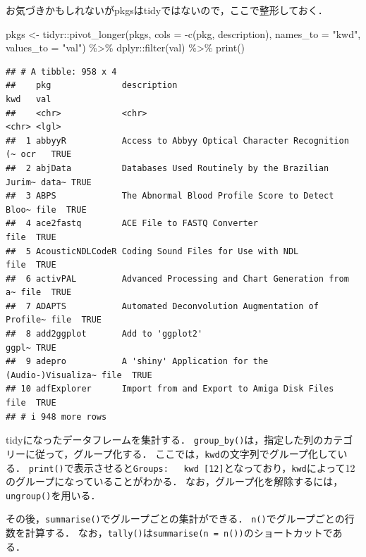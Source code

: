\documentclass[
]{article}
\newenvironment{Shaded}{\begin{snugshade}}{\end{snugshade}}
\newcommand{\AttributeTok}[1]{\textcolor[rgb]{0.77,0.63,0.00}{#1}}
\newcommand{\FunctionTok}[1]{\textcolor[rgb]{0.00,0.00,0.00}{#1}}
\newcommand{\NormalTok}[1]{#1}
\newcommand{\OtherTok}[1]{\textcolor[rgb]{0.56,0.35,0.01}{#1}}
\newcommand{\SpecialCharTok}[1]{\textcolor[rgb]{0.00,0.00,0.00}{#1}}
\newcommand{\StringTok}[1]{\textcolor[rgb]{0.31,0.60,0.02}{#1}}
\begin{document}
お気づきかもしれないがpkgsはtidyではないので，ここで整形しておく．

\begin{Shaded}
\begin{Highlighting}[]
\NormalTok{pkgs }\OtherTok{\textless{}{-}} 
\NormalTok{  tidyr}\SpecialCharTok{::}\FunctionTok{pivot\_longer}\NormalTok{(pkgs, }
    \AttributeTok{cols =} \SpecialCharTok{{-}}\FunctionTok{c}\NormalTok{(pkg, description), }\AttributeTok{names\_to =} \StringTok{"kwd"}\NormalTok{, }\AttributeTok{values\_to =} \StringTok{"val"}\NormalTok{) }\SpecialCharTok{\%\textgreater{}\%}
\NormalTok{    dplyr}\SpecialCharTok{::}\FunctionTok{filter}\NormalTok{(val) }\SpecialCharTok{\%\textgreater{}\%}
    \FunctionTok{print}\NormalTok{()}
\end{Highlighting}
\end{Shaded}

\begin{verbatim}
## # A tibble: 958 x 4
##    pkg              description                                      kwd   val  
##    <chr>            <chr>                                            <chr> <lgl>
##  1 abbyyR           Access to Abbyy Optical Character Recognition (~ ocr   TRUE 
##  2 abjData          Databases Used Routinely by the Brazilian Jurim~ data~ TRUE 
##  3 ABPS             The Abnormal Blood Profile Score to Detect Bloo~ file  TRUE 
##  4 ace2fastq        ACE File to FASTQ Converter                      file  TRUE 
##  5 AcousticNDLCodeR Coding Sound Files for Use with NDL              file  TRUE 
##  6 activPAL         Advanced Processing and Chart Generation from a~ file  TRUE 
##  7 ADAPTS           Automated Deconvolution Augmentation of Profile~ file  TRUE 
##  8 add2ggplot       Add to 'ggplot2'                                 ggpl~ TRUE 
##  9 adepro           A 'shiny' Application for the (Audio-)Visualiza~ file  TRUE 
## 10 adfExplorer      Import from and Export to Amiga Disk Files       file  TRUE 
## # i 948 more rows
\end{verbatim}

tidyになったデータフレームを集計する．
\texttt{group\_by()}は，指定した列のカテゴリーに従って，グループ化する．
ここでは，\texttt{kwd}の文字列でグループ化している．
\texttt{print()}で表示させると\texttt{Groups:\ \ \ kwd\ {[}12{]}}となっており，\texttt{kwd}によって12のグループになっていることがわかる．
なお，グループ化を解除するには，\texttt{ungroup()}を用いる．

その後，\texttt{summarise()}でグループごとの集計ができる．
\texttt{n()}でグループごとの行数を計算する．
なお，\texttt{tally()}は\texttt{summarise(n\ =\ n())}のショートカットである．
\end{document}

